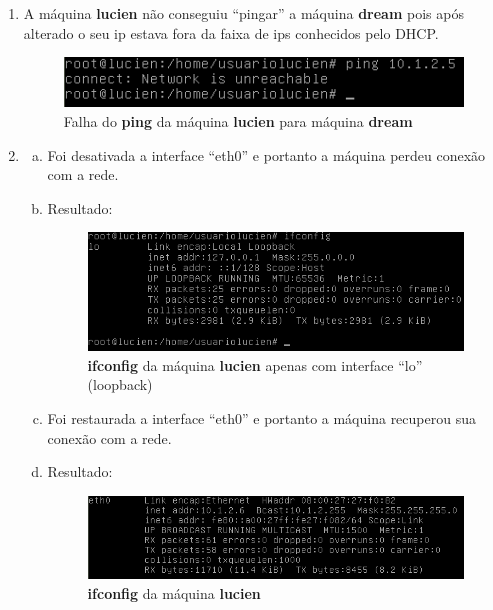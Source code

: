 \documentclass[a4paper, 12pt]{article}
\begin{document}
\begin{enumerate}
\FloatBarrier
\item A máquina {\bf lucien} não conseguiu ``pingar'' a máquina {\bf
    dream} pois após alterado o seu ip estava fora da faixa de ips
  conhecidos pelo DHCP.

\begin{figure}[h!]
\centering
\includegraphics[width=\textwidth]{1-falha-ping-lucien-dream.png}
\caption{Falha do {\bf ping} da máquina {\bf lucien} para máquina {\bf dream}}
\end{figure}

\FloatBarrier
\item
\begin{enumerate}[a.]

\item Foi desativada a interface ``eth0'' e portanto a máquina perdeu
  conexão com a rede.

\FloatBarrier
\item Resultado:
\begin{figure}[h!]
\centering
\includegraphics[width=\textwidth]{1-ifconfig-lucien-lo.png}
\caption{{\bf ifconfig} da máquina {\bf lucien} apenas com interface
  ``lo'' (loopback)}
\end{figure}

\item Foi restaurada a interface ``eth0'' e portanto a máquina
  recuperou sua conexão com a rede.

\FloatBarrier
\item Resultado:
\begin{figure}[h!]
\centering
\includegraphics[width=\textwidth]{1-ifconfig-lucien.png}
\caption{{\bf ifconfig} da máquina {\bf lucien}}
\end{figure}


\end{enumerate}
\end{enumerate}
\end{document}
